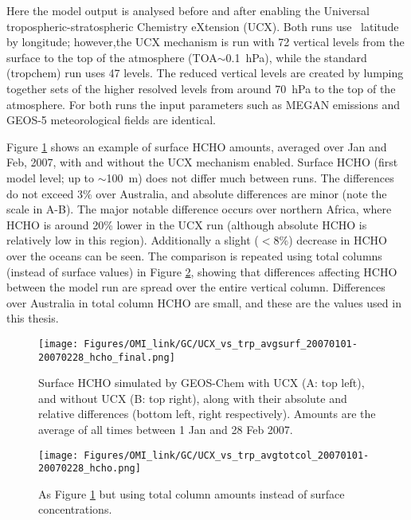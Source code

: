 Here the model output is analysed before and after enabling the Universal tropospheric-stratospheric Chemistry eXtension (UCX).
Both runs use \lowhr ~latitude by longitude; however,the UCX mechanism is run with 72 vertical levels from the surface to the top of the atmosphere (TOA$\sim$0.1~hPa), while the standard (tropchem) run uses 47 levels.
The reduced vertical levels are created by lumping together sets of the higher resolved levels from around 70~hPa to the top of the atmosphere.
For both runs the input parameters such as MEGAN emissions and GEOS-5 meteorological fields are identical.

Figure \ref{Model:GC:simulations:comparison:fig_UCXvsTrop_HCHO_surf_fullday} shows an example of surface HCHO amounts, averaged over Jan and Feb, 2007, with and without the UCX mechanism enabled.
Surface HCHO (first model level; up to $\sim$100~m) does not differ much between runs.
The differences do not exceed 3\% over Australia, and absolute differences are minor (note the scale in A-B).
The major notable difference occurs over northern Africa, where HCHO is around 20\% lower in the UCX run (although absolute HCHO is relatively low in this region).
Additionally a slight ($<8\%$) decrease in HCHO over the oceans can be seen.
The comparison is repeated using total columns (instead of surface values) in Figure \ref{Model:GC:simulations:comparison:fig_UCXvsTrop_HCHO_totcol_fullday}, showing that differences affecting HCHO between the model run are spread over the entire vertical column.
Differences over Australia in total column HCHO are small, and these are the values used in this thesis.

\begin{figure}
  \texttt{[image: Figures/OMI\_link/GC/UCX\_vs\_trp\_avgsurf\_20070101-20070228\_hcho\_final.png]}
  \caption{%
    Surface HCHO simulated by GEOS-Chem with UCX (A: top left), and without UCX (B: top right), along with their absolute and relative differences (bottom left, right respectively).
    Amounts are the average of all times between 1 Jan and 28 Feb 2007.
  }
  \label{Model:GC:simulations:comparison:fig_UCXvsTrop_HCHO_surf_fullday}
\end{figure}

\begin{figure}
  \texttt{[image: Figures/OMI\_link/GC/UCX\_vs\_trp\_avgtotcol\_20070101-20070228\_hcho.png]}
  \caption{%
    As Figure \ref{Model:GC:simulations:comparison:fig_UCXvsTrop_HCHO_surf_fullday} but using total column amounts instead of surface concentrations.
  }
  \label{Model:GC:simulations:comparison:fig_UCXvsTrop_HCHO_totcol_fullday}
\end{figure}



